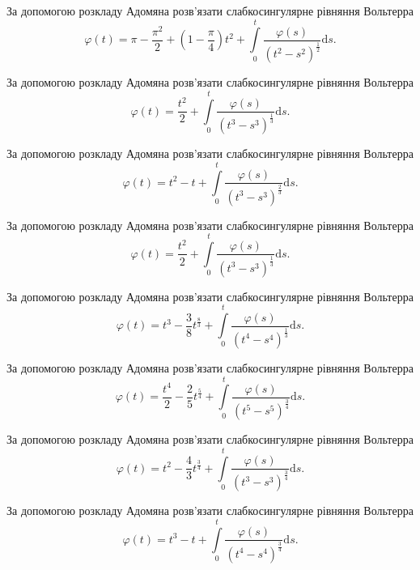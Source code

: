 \documentclass[12pt]{extarticle}
\begin{document}
\begin{Exercise}
За допомогою розкладу Адомяна розв’язати слабкосингулярне рівняння Вольтерра \[\varphi(t) = \pi - \dfrac{\pi^2}{2} + \left(1-\dfrac{\pi}{4}\right) t^2 + \int\limits_{0}^{t} \dfrac{\varphi(s)}{\left(t^2 - s^2\right)^\frac{1}{2}} \mathrm{d}s.\]
\end{Exercise}

\begin{Exercise}
За допомогою розкладу Адомяна розв’язати слабкосингулярне рівняння Вольтерра \[\varphi(t) = \dfrac{t^2}{2} + \int\limits_{0}^{t} \dfrac{\varphi(s)}{\left(t^3 - s^3\right)^\frac{1}{3}} \mathrm{d}s.\]
\end{Exercise}

\begin{Exercise}
За допомогою розкладу Адомяна розв’язати слабкосингулярне рівняння Вольтерра \[\varphi(t) = t^2 -t + \int\limits_{0}^{t} \dfrac{\varphi(s)}{\left(t^3 - s^3\right)^\frac{2}{3}} \mathrm{d}s.\]
\end{Exercise}

\begin{Exercise}
За допомогою розкладу Адомяна розв’язати слабкосингулярне рівняння Вольтерра \[\varphi(t) = \dfrac{t^2}{2} + \int\limits_{0}^{t} \dfrac{\varphi(s)}{\left(t^3 - s^3\right)^\frac{1}{3}} \mathrm{d}s.\]
\end{Exercise}

\begin{Exercise}
За допомогою розкладу Адомяна розв’язати слабкосингулярне рівняння Вольтерра \[\varphi(t) = t^3 - \dfrac{3}{8}t^\frac{8}{3} + \int\limits_{0}^{t} \dfrac{\varphi(s)}{\left(t^4 - s^4\right)^\frac{1}{3}} \mathrm{d}s.\]
\end{Exercise}

\begin{Exercise}
За допомогою розкладу Адомяна розв’язати слабкосингулярне рівняння Вольтерра \[\varphi(t) = \dfrac{t^4}{2} - \dfrac{2}{5}t^{\frac{5}{4}} + \int\limits_{0}^{t} \dfrac{\varphi(s)}{\left(t^5 - s^5\right)^\frac{3}{4}} \mathrm{d}s.\]
\end{Exercise}

\begin{Exercise}
За допомогою розкладу Адомяна розв’язати слабкосингулярне рівняння Вольтерра \[\varphi(t) = t^2 - \dfrac{4}{3}t^{\frac{3}{4}} + \int\limits_{0}^{t} \dfrac{\varphi(s)}{\left(t^3 - s^3\right)^\frac{3}{4}} \mathrm{d}s.\]
\end{Exercise}

\begin{Exercise}
За допомогою розкладу Адомяна розв’язати слабкосингулярне рівняння Вольтерра \[\varphi(t) = t^3 - t + \int\limits_{0}^{t} \dfrac{\varphi(s)}{\left(t^4 - s^4\right)^\frac{3}{4}} \mathrm{d}s.\]
\end{Exercise}
\end{document}
